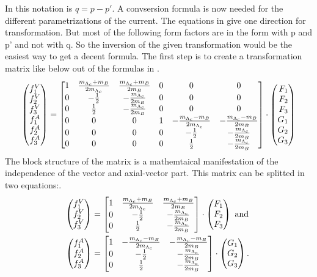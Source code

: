 In this notation is \(q = p - p'\). A convsersion formula is now needed for the 
different parametrizations of the current. The equations in 
{\cite[Eq. 15]{form_factor_conversion}} give one direction for transformation. 
But most of the following form factors are in the form with p and p' and not 
with q. So the inversion of the given transformation would be the easiest 
way to get a decent formula.  
The first step is to create a transformation matrix like below out of the 
formulas in {\cite[Eq. 15]{form_factor_conversion}}.
\begin{equation}
  \Spvek{f^V_1; f^V_2; f^V_3; f^A_1; f^A_2; f^A_3} =
  \begin{bmatrix}
    1 & \frac{m_{\Lambda_c} + m_B }{2 m_{\Lambda_c}} & \frac{m_{\Lambda_c} + m_B }{2 m_B} & 0 & 0 & 0 \\
    0 & -\frac{1}{2} & -\frac{m_{\Lambda_c}}{2 m_B} & 0 & 0 & 0 \\
    0 & \frac{1}{2} & -\frac{m_{\Lambda_c}}{2 m_B} & 0 & 0 & 0 \\
    0 & 0 & 0 & 1 & -\frac{m_{\Lambda_c} - m_B }{2 m_{\Lambda_c}} & - \frac{m_{\Lambda_c} - m_B }{2 m_B} \\
    0 & 0 & 0 & 0 & -\frac{1}{2} & -\frac{m_{\Lambda_c}}{2 m_B} \\
    0 & 0 & 0 & 0 & \frac{1}{2} & -\frac{m_{\Lambda_c}}{2 m_B}
  \end{bmatrix}
  \cdot \Spvek{F_1; F_2; F_3; G_1; G_2; G_3} \label{eq:initmat}
\end{equation}
The block structure of the matrix is a mathemtaical manifestation of the 
independence of the vector and axial-vector part. This matrix can be splitted 
in two equations:.
\begin{align}
  \Spvek{f^V_1; f^V_2; f^V_3} & =
  \begin{bmatrix}
    1 & \frac{m_{\Lambda_c} + m_B }{2 m_{\Lambda_c}} & \frac{m_{\Lambda_c} + m_B }{2 m_B} \\
    0 & -\frac{1}{2} & -\frac{m_{\Lambda_c}}{2 m_B} \\
    0 & \frac{1}{2} & -\frac{m_{\Lambda_c}}{2 m_B} \\
  \end{bmatrix}
  \cdot \Spvek{F_1; F_2; F_3} \nonumber \text{ and }\\
  \Spvek{f^A_1; f^A_2; f^A_3} & =
  \begin{bmatrix}
    1 & -\frac{m_{\Lambda_c} - m_B }{2 m_{\Lambda_c}} & - \frac{m_{\Lambda_c} - m_B }{2 m_B} \\
    0 & -\frac{1}{2} & -\frac{m_{\Lambda_c}}{2 m_B} \\
    0 & \frac{1}{2} & -\frac{m_{\Lambda_c}}{2 m_B}
  \end{bmatrix}
  \cdot \Spvek{G_1; G_2; G_3}. \label{eq:splitmat}
\end{align}
